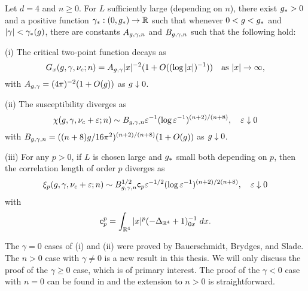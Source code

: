 \begin{theorem} \label{thm:suscept}
  Let $d = 4$ and $n \ge 0$. For $L$ sufficiently large (depending on $n$),
  there exist $g_* > 0$
  and a positive function $\gamma_* : (0, g_*) \rightarrow {\mathbb R}$
  such that whenever $0 < g < g_*$ and $|\gamma| < \gamma_*(g)$,
  there are constants $A_{g,\gamma,n}$ and $B_{g,\gamma,n}$ such that the following hold:

  \smallskip\noindent
  (i)
  The critical two-point function decays as
  \begin{equation}
    G_x(g,\gamma,\nu_c; n)
        =
    A_{g,\gamma} |x|^{-2} (1 + O((\log |x|)^{-1}))
        \quad
    \text{as $|x|\rightarrow\infty$},
  \end{equation}
  with $A_{g,\gamma} = (4 \pi)^{-2} (1 + O(g))$ as $g \downarrow 0$.

  \smallskip\noindent
  (ii)
  The susceptibility diverges as
  \begin{equation} \label{e:chieps-asympt}
    \chi(g, \gamma, \nu_c + \varepsilon; n)
      \sim B_{g,\gamma,n} \varepsilon^{-1} (\log \varepsilon^{-1})^{(n+2)/(n+8)},
    \quad \varepsilon\downarrow 0
  \end{equation}
  with $B_{g,\gamma,n} = ((n + 8) g / 16\pi^2)^{(n+2)/(n+8)} (1 + O(g))$
  as $g \downarrow 0$.

  \smallskip\noindent
  (iii) For any $p >0$, if $L$ is chosen large and $g_*$ small both depending on $p$,
  then the correlation length of order $p$ diverges as
  \begin{equation} \label{e:xieps-asympt}
    \xi_p(g, \gamma, \nu_c + \varepsilon; n)
     \sim B_{g,\gamma,n}^{1/2} {\sf c}_p \varepsilon^{-1/2} (\log \varepsilon^{-1})^{(n+2)/2(n+8)},
    \quad \varepsilon\downarrow 0
  \end{equation}
  with
  \begin{equation}
  {\sf c}_p^p = \int_{{\mathbb R}^4} |x|^p (-\Delta_{{\mathbb R}^4} + 1)^{-1}_{0x} \; dx.
  \end{equation}
\end{theorem}

The $\gamma = 0$ cases of (i) and (ii) were proved by Bauerschmidt, Brydges, and
Slade. The $n > 0$ case with $\gamma \ne 0$ is a new result in this thesis. We
will only discuss the proof of the $\gamma \ge 0$ case, which is of primary
interest. The proof of the $\gamma < 0$ case with $n = 0$ can be found in
\cite{BSW-saw-sa} and the extension to $n > 0$ is straightforward.

